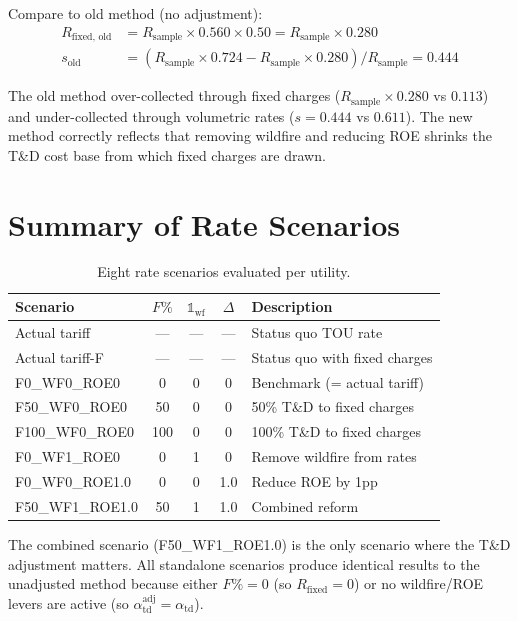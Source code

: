 \documentclass[11pt]{article}
\begin{document}
Compare to old method (no adjustment):
\begin{align}
R_{\text{fixed, old}} &= R_{\text{sample}} \times 0.560 \times 0.50 = R_{\text{sample}} \times 0.280 \\
s_{\text{old}} &= (R_{\text{sample}} \times 0.724 - R_{\text{sample}} \times 0.280) / R_{\text{sample}} = 0.444
\end{align}

The old method over-collected through fixed charges ($R_{\text{sample}} \times 0.280$ vs $0.113$) and under-collected through volumetric rates ($s = 0.444$ vs $0.611$). The new method correctly reflects that removing wildfire and reducing ROE shrinks the T\&D cost base from which fixed charges are drawn.

\section{Summary of Rate Scenarios}

\begin{table}[htbp]
\centering
\caption{Eight rate scenarios evaluated per utility.}
\begin{tabular}{l c c c l}
\toprule
\textbf{Scenario} & $F\%$ & $\mathbb{1}_{\text{wf}}$ & $\Delta$ & \textbf{Description} \\
\midrule
Actual tariff & --- & --- & --- & Status quo TOU rate \\
Actual tariff-F & --- & --- & --- & Status quo with fixed charges \\
F0\_WF0\_ROE0 & 0 & 0 & 0 & Benchmark (= actual tariff) \\
F50\_WF0\_ROE0 & 50 & 0 & 0 & 50\% T\&D to fixed charges \\
F100\_WF0\_ROE0 & 100 & 0 & 0 & 100\% T\&D to fixed charges \\
F0\_WF1\_ROE0 & 0 & 1 & 0 & Remove wildfire from rates \\
F0\_WF0\_ROE1.0 & 0 & 0 & 1.0 & Reduce ROE by 1pp \\
F50\_WF1\_ROE1.0 & 50 & 1 & 1.0 & Combined reform \\
\bottomrule
\end{tabular}
\end{table}

The combined scenario (F50\_WF1\_ROE1.0) is the only scenario where the T\&D adjustment matters. All standalone scenarios produce identical results to the unadjusted method because either $F\% = 0$ (so $R_{\text{fixed}} = 0$) or no wildfire/ROE levers are active (so $\alpha_{\text{td}}^{\text{adj}} = \alpha_{\text{td}}$).
\end{document}
